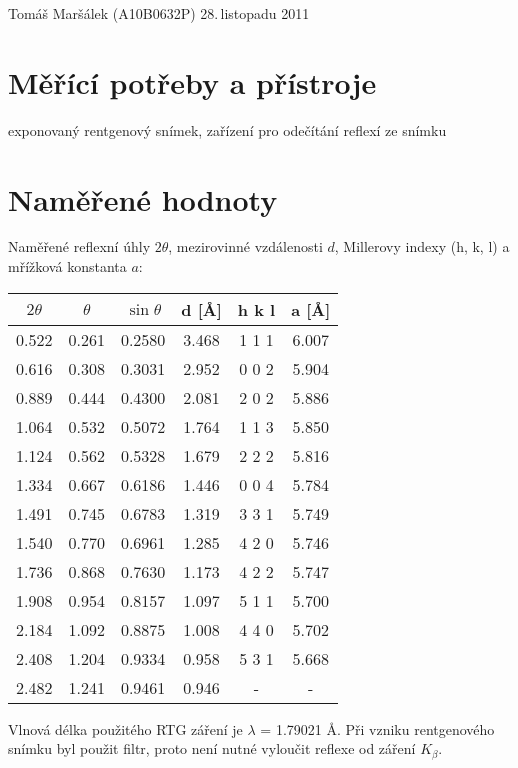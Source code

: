 \documentclass[11pt]{article}
\begin{document}
 {Tomáš Maršálek}
 {(A10B0632P)}
 {28.\,listopadu 2011}

\section{Měřící potřeby a přístroje}
exponovaný rentgenový snímek, zařízení pro odečítání reflexí ze snímku

\section{Naměřené hodnoty}
Naměřené reflexní úhly $2\theta$, mezirovinné vzdálenosti $d$, Millerovy indexy
(h, k, l) a mřížková konstanta $a$: \\

\begin{center}
\begin{tabular}{|c|c|c|c|c|c|}
\hline
$2\theta$ & $\theta$ & $\sin\theta$ & d [\AA] & h k l & a [\AA] \\
\hline
0.522 & 0.261 & 0.2580 & 3.468 & 1 1 1 & 6.007 \\
0.616 & 0.308 & 0.3031 & 2.952 & 0 0 2 & 5.904 \\
0.889 & 0.444 & 0.4300 & 2.081 & 2 0 2 & 5.886 \\
1.064 & 0.532 & 0.5072 & 1.764 & 1 1 3 & 5.850 \\
1.124 & 0.562 & 0.5328 & 1.679 & 2 2 2 & 5.816 \\
1.334 & 0.667 & 0.6186 & 1.446 & 0 0 4 & 5.784 \\
1.491 & 0.745 & 0.6783 & 1.319 & 3 3 1 & 5.749 \\
1.540 & 0.770 & 0.6961 & 1.285 & 4 2 0 & 5.746 \\
1.736 & 0.868 & 0.7630 & 1.173 & 4 2 2 & 5.747 \\
1.908 & 0.954 & 0.8157 & 1.097 & 5 1 1 & 5.700 \\
2.184 & 1.092 & 0.8875 & 1.008 & 4 4 0 & 5.702 \\
2.408 & 1.204 & 0.9334 & 0.958 & 5 3 1 & 5.668 \\
2.482 & 1.241 & 0.9461 & 0.946 & -     & -     \\
\hline
\end{tabular}
\end{center}

Vlnová délka použitého RTG záření je $\lambda$ = 1.79021 \AA. Při vzniku
rentgenového snímku byl použit filtr, proto není nutné vyloučit reflexe od
záření $K_\beta$.
\end{document}

